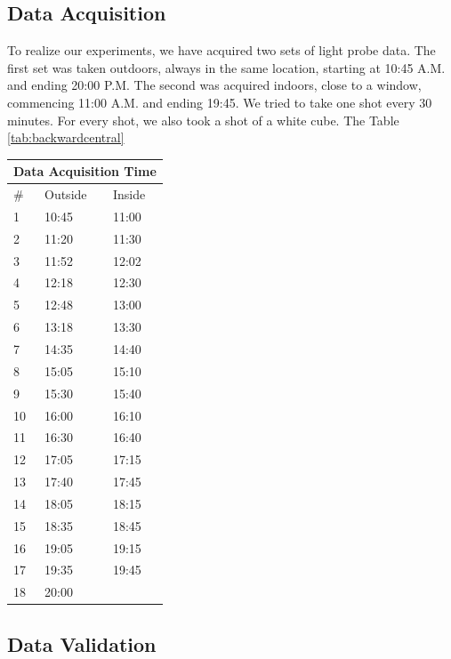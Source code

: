 \documentclass[conference]{acmsiggraph}
\begin{document}
\subsection{Data Acquisition}
	To realize our experiments, we have acquired two sets of light probe data. The first set was taken outdoors, always in the same location, starting at 10:45 A.M. and ending 20:00 P.M. The second was acquired indoors, close to a window, commencing 11:00 A.M. and ending 19:45. We tried to take one shot every 30 minutes. For every shot, we also took a shot of a white cube. The Table \ref{tab:backwardcentral} 
\begin{center}
    \begin{tabular}{| l | l | l |}
	\hline
    \multicolumn{3}{|c|}{Data Acquisition Time} \\
    \hline
    \# & Outside & Inside \\
    \hline
    1 & 10:45 & 11:00 \\
    \hline
    2 & 11:20 & 11:30 \\
    \hline
    3 & 11:52 & 12:02 \\
    \hline
    4 & 12:18 & 12:30 \\
    \hline
    5 & 12:48 & 13:00 \\
    \hline
	6 & 13:18 & 13:30 \\
    \hline
	7 & 14:35 & 14:40 \\
    \hline
	8 & 15:05 & 15:10 \\
    \hline
    9 & 15:30 & 15:40 \\
    \hline
	10 & 16:00 & 16:10 \\
    \hline
	11 & 16:30 & 16:40 \\
    \hline
	12 & 17:05 & 17:15 \\
    \hline
	13 & 17:40 & 17:45 \\
    \hline
	14 & 18:05 & 18:15 \\
    \hline
	15 & 18:35 & 18:45 \\
    \hline
	16 & 19:05 & 19:15 \\
    \hline
	17 & 19:35 & 19:45 \\
    \hline
	18 & 20:00 & \\
    \hline
    \end{tabular}
    \label{tab:backwardcentral}
\end{center}

\subsection{Data Validation}
\end{document}
